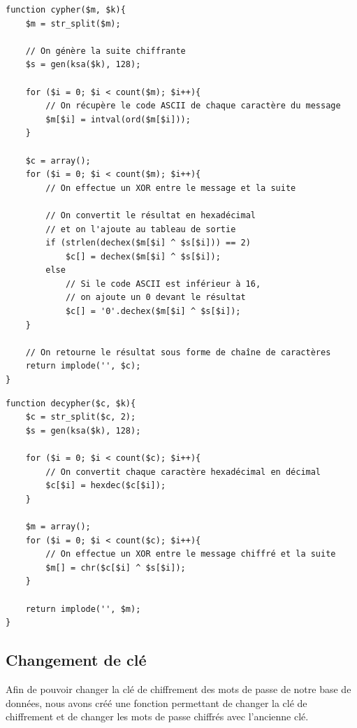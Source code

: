 \documentclass[12pt, a4paper]{article}
\begin{document}
\begin{lstlisting}[name=Fonction de chiffrement]
function cypher($m, $k){
    $m = str_split($m);
    
    // On génère la suite chiffrante
    $s = gen(ksa($k), 128);

    for ($i = 0; $i < count($m); $i++){
        // On récupère le code ASCII de chaque caractère du message
        $m[$i] = intval(ord($m[$i]));
    }

    $c = array();
    for ($i = 0; $i < count($m); $i++){
        // On effectue un XOR entre le message et la suite

        // On convertit le résultat en hexadécimal
        // et on l'ajoute au tableau de sortie
        if (strlen(dechex($m[$i] ^ $s[$i])) == 2)
            $c[] = dechex($m[$i] ^ $s[$i]);
        else
            // Si le code ASCII est inférieur à 16,
            // on ajoute un 0 devant le résultat
            $c[] = '0'.dechex($m[$i] ^ $s[$i]);
    }

    // On retourne le résultat sous forme de chaîne de caractères
    return implode('', $c);
}
\end{lstlisting}

\begin{lstlisting}[name=Fonction de déchiffrement]
function decypher($c, $k){
    $c = str_split($c, 2);
    $s = gen(ksa($k), 128);

    for ($i = 0; $i < count($c); $i++){
        // On convertit chaque caractère hexadécimal en décimal
        $c[$i] = hexdec($c[$i]);
    }

    $m = array();
    for ($i = 0; $i < count($c); $i++){
        // On effectue un XOR entre le message chiffré et la suite
        $m[] = chr($c[$i] ^ $s[$i]);
    }

    return implode('', $m);
}
\end{lstlisting}

\subsection*{Changement de clé}

Afin de pouvoir changer la clé de chiffrement des mots de passe de notre base de données,
nous avons créé une fonction permettant de changer la clé de chiffrement
et de changer les mots de passe chiffrés avec l'ancienne clé.
\end{document}
